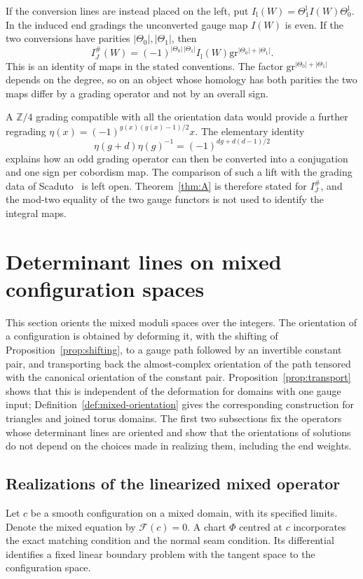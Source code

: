 \documentclass[11pt]{amsart}
\theoremstyle{definition}
\theoremstyle{remark}
\theoremstyle{plain}
\numberwithin{equation}{section}
\newcommand{\ZZ}{\mathbb Z}
\newcommand{\IG}{I^{\#}_{J}}
\newcommand{\eps}{\mathrm{gr}}
\begin{document}
If the conversion lines are instead placed on the left, put
$I_{\mathrm l}(W)=\Theta^{\mathrm l}_1I(W)\Theta^{\mathrm l}_0$.
In the induced end gradings the unconverted gauge map $I(W)$ is
even. If the two conversions have parities $|\Theta_0|,|\Theta_1|$, then
\begin{equation}\label{eq:gauge-dictionary}
 \IG(W)=(-1)^{|\Theta_0|\,|\Theta_1|}I_{\mathrm l}(W)\eps^{|\Theta_0|+|\Theta_1|}.
\end{equation}
This is an identity of maps in the stated conventions. The factor
$\eps^{|\Theta_0|+|\Theta_1|}$ depends on the degree, so on an object whose
homology has both parities the two maps differ by a grading
operator and not by an overall sign.

A $\ZZ/4$ grading compatible with all the orientation data
would provide a further regrading
$\eta(x)=(-1)^{g(x)(g(x)-1)/2}x$. The elementary identity
\[
 \eta(g+d)\eta(g)^{-1}
   =(-1)^{dg+d(d-1)/2}
\]
explains how an odd grading operator can then be converted
into a conjugation and one sign per cobordism map. The
comparison of such a lift with the grading data of
Scaduto~\cite{Scaduto} is left open. Theorem~\ref{thm:A} is
therefore stated for $\IG$, and the mod-two equality of the two
gauge functors is not used to identify the integral maps.

\section{Determinant lines on mixed configuration spaces}
\label{sec:determinants}

This section orients the mixed moduli spaces over the integers. The
orientation of a configuration is obtained by deforming it, with the
shifting of Proposition~\ref{prop:shifting}, to a gauge path followed
by an invertible constant pair, and transporting back the
almost-complex orientation of the path tensored with the canonical
orientation of the constant pair. Proposition~\ref{prop:transport}
shows that this is independent of the deformation for domains with one
gauge input; Definition~\ref{def:mixed-orientation} gives the
corresponding construction for triangles and joined torus domains.
The first two subsections fix the operators whose determinant lines
are oriented and show that the orientations of solutions do not depend
on the choices made in realizing them, including the end weights.

\subsection{Realizations of the linearized mixed operator}
Let $c$ be a smooth configuration on a mixed domain, with
its specified limits. Denote the mixed equation by
$\mathcal F(c)=0$. A chart $\Phi$ centred at $c$ incorporates
the exact matching condition and the normal seam condition.
Its differential identifies a fixed linear boundary problem
with the tangent space to the configuration space.
\end{document}

